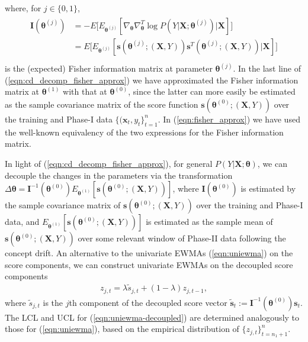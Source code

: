 \documentclass[twoside,11pt]{article}
\begin{document}
where, for $ j\in\{0,1\}$,
\begin{align}
\begin{aligned}
\mathbf {I}(\bm { \theta}^{ (j)}) &= -E \big[ E _{\bm { \theta}^{ (j)}}[\nabla_{\bm { \theta}} \nabla^T _{\bm { \theta}}{ \log{P}(Y|\bm{X};\bm { \theta}^{ (j)})} | \bm {X}] \big]  \\
&= E \big[ E _{\bm { \theta}^{ (j)}}[\bm{s}(\bm { \theta}^{ (j)}; (\bm {X}, Y)) \bm{s}^T(\bm { \theta}^{ (j)}; (\bm {X}, Y)) | \bm {X}] \big]\\
\end{aligned}
\label{eqn:fisher_approx}
\end{align}
is the (expected) Fisher information matrix at parameter $\bm { \theta} ^{ (j)}$. In the last line of (\ref{eqn:cd_decomp_fisher_approx}) we have approximated the Fisher information matrix at $\bm { \theta} ^{ (1)}$ with that at $\bm { \theta} ^{ (0)}$, since the latter can more easily be estimated as the sample covariance matrix of the score function $\bm{s}(\bm { \theta}^{ (0)}; (\bm {X}, Y))$ over the training and Phase-I data $\{(\bm{x}_t,y_t\}_{t=1}^n$. In (\ref{eqn:fisher_approx}) we have used the well-known equivalency of the two expressions for the Fisher information matrix. 

In light of (\ref{eqn:cd_decomp_fisher_approx}), for general $P(Y|\bm{X};\bm{\theta})$, we can decouple the changes in the parameters via the transformation $ \Delta \bm { \theta} = \mathbf {I}^{-1}(\bm { \theta}^{ (0)}) E_{\bm{ \theta}^{ (1)}}[\bm{s}(\bm { \theta}^{ (0)}; (\bm {X}, Y))]$, where $\mathbf {I}(\bm { \theta}^{ (0)})$ is estimated by the sample covariance matrix of $\bm{s}(\bm { \theta}^{ (0)}; (\bm {X}, Y))$ over the training and Phase-I data, and $E_{\bm{ \theta}^{ (1)}}[\bm{s}(\bm { \theta}^{ (0)}; (\bm {X}, Y))]$ is estimated as the sample mean of $\bm{s}(\bm { \theta}^{ (0)}; (\bm {X}, Y))$ over some relevant window of Phase-II data following the concept drift. An alternative to the univariate EWMAs (\ref{eqn:uniewma}) on the score components, we can construct univariate EWMAs on the decoupled score components
\begin{align}
z_{j,t} = \lambda \tilde{s}_{j,t} + (1 - \lambda) z_{j,t-1},
\label{eqn:uniewma-decoupled}
\end{align}
where $\tilde{s}_{j,t}$ is the $j$th component of the decoupled score vector $\tilde{\bm{s}}_t := \mathbf {I}^{-1}(\bm { \theta}^{ (0)})\bm{s}_t$. The LCL and UCL for (\ref{eqn:uniewma-decoupled}) are determined analogously to those for (\ref{eqn:uniewma}), based on the empirical distribution of $\{z_{j,t}\}_{t=n_1+1}^n$.  
\end{document}
